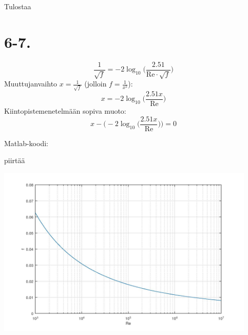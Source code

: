 \documentclass{article}
\begin{document}


Tulostaa



\section*{6-7.}

\[
  \frac{1}{\sqrt{f}} = -2\log_{10} \Big(\frac{2.51}{\text{Re} \cdot \sqrt{f}}\Big)
\]
Muuttujanvaihto $x = \frac{1}{\sqrt{f}}$ (jolloin $f = \frac{1}{x^2}$):
\[
  x = -2\log_{10} \Big(\frac{2.51x}{\text{Re}}\Big)
\]
Kiintopistemenetelmään sopiva muoto:
\[
  x - \Big(-2\log_{10} \Big(\frac{2.51x}{\text{Re}}\Big)\Big) = 0
\]

Matlab-koodi:



piirtää

\begin{center}
\includegraphics[width=350pt]{w1_6.jpg}
\end{center}
\end{document}
